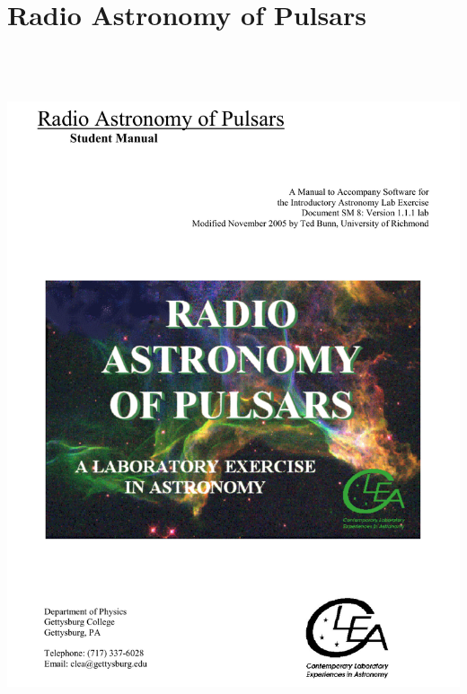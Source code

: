 \section{Radio Astronomy of Pulsars}

\makelabheader

\bigskip\bigskip

\includegraphics[height=8in]{pulsars/pulsar1.pdf}
\vfil\eject

